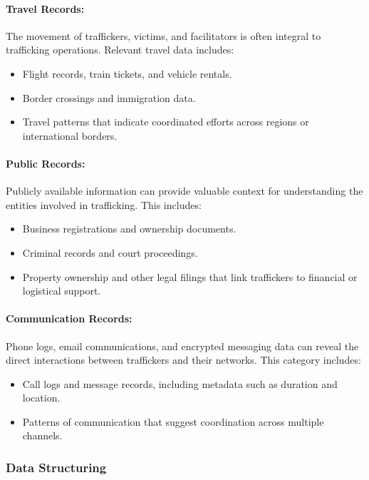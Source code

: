 \documentclass[%
 preprint, linenumbers,
 amsmath,amssymb,
 aps, physrev,
]{revtex4-2}
\begin{document}
\paragraph{Travel Records:}
The movement of traffickers, victims, and facilitators is often integral to trafficking operations. Relevant travel data includes:
\begin{itemize}
    \item Flight records, train tickets, and vehicle rentals.
    \item Border crossings and immigration data.
    \item Travel patterns that indicate coordinated efforts across regions or international borders.
\end{itemize}

\paragraph{Public Records:}
Publicly available information can provide valuable context for understanding the entities involved in trafficking. This includes:
\begin{itemize}
    \item Business registrations and ownership documents.
    \item Criminal records and court proceedings.
    \item Property ownership and other legal filings that link traffickers to financial or logistical support.
\end{itemize}

\paragraph{Communication Records:}
Phone logs, email communications, and encrypted messaging data can reveal the direct interactions between traffickers and their networks. This category includes:
\begin{itemize}
    \item Call logs and message records, including metadata such as duration and location.
    \item Patterns of communication that suggest coordination across multiple channels.
\end{itemize}

\subsubsection{Data Structuring}
\end{document}
